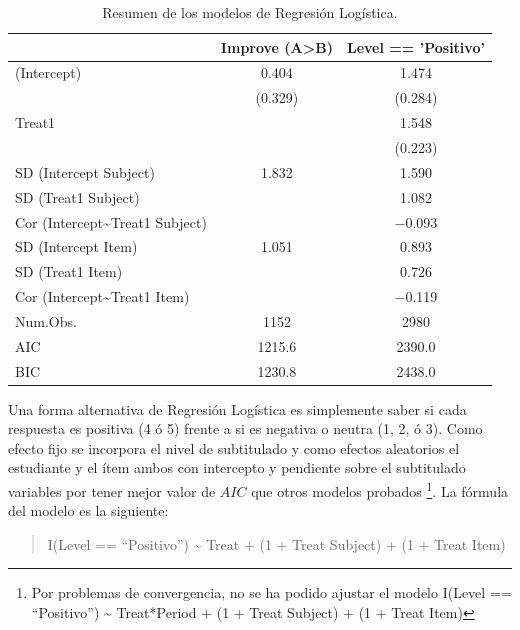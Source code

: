 \documentclass[
  12pt,
  a4paper,
  extrafontsizes,
  onecolumn,
  openright,
  table]{memoir}
\begin{document}
\hypertarget{tbl-selected-logistic}{}
\begin{table}
\caption{\label{tbl-selected-logistic}Resumen de los modelos de Regresión Logística. }\tabularnewline

\centering
\begin{tabular}[t]{lcc}
\toprule
  & Improve (A>B) & Level == 'Positivo'\\
\midrule
(Intercept) & \num{0.404} & \num{1.474}\\
 & (\num{0.329}) & (\num{0.284})\\
Treat1 &  & \num{1.548}\\
 &  & (\num{0.223})\\
SD (Intercept Subject) & \num{1.832} & \num{1.590}\\
SD (Treat1 Subject) &  & \num{1.082}\\
Cor (Intercept\textasciitilde{}Treat1 Subject) &  & \num{-0.093}\\
SD (Intercept Item) & \num{1.051} & \num{0.893}\\
SD (Treat1 Item) &  & \num{0.726}\\
Cor (Intercept\textasciitilde{}Treat1 Item) &  & \num{-0.119}\\
\midrule
Num.Obs. & \num{1152} & \num{2980}\\
AIC & \num{1215.6} & \num{2390.0}\\
BIC & \num{1230.8} & \num{2438.0}\\
\bottomrule
\end{tabular}
\end{table}

Una forma alternativa de Regresión Logística es simplemente saber si
cada respuesta es positiva (4 ó 5) frente a si es negativa o neutra (1,
2, ó 3). Como efecto fijo se incorpora el nivel de subtitulado y como
efectos aleatorios el estudiante y el ítem ambos con intercepto y
pendiente sobre el subtitulado variables por tener mejor valor de
\(AIC\) que otros modelos probados \footnote{Por problemas de
  convergencia, no se ha podido ajustar el modelo I(Level ==
  \enquote{Positivo}) \textasciitilde{} Treat*Period + (1 + Treat
  \textbar{} Subject) + (1 + Treat \textbar{} Item)}. La fórmula del
modelo es la siguiente:

\small

\begin{quote}
I(Level == \enquote{Positivo}) \textasciitilde{} Treat + (1 + Treat
\textbar{} Subject) + (1 + Treat \textbar{} Item)
\end{quote}
\end{document}
